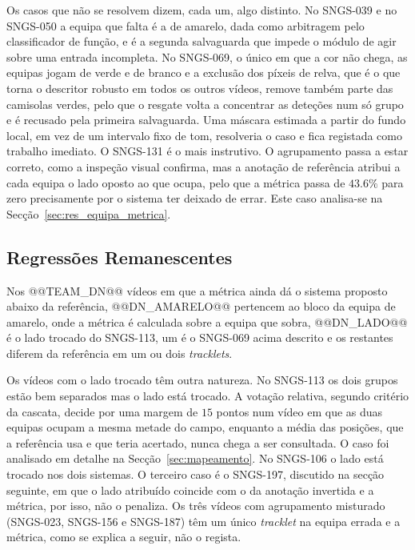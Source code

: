 Os casos que não se resolvem dizem, cada um, algo distinto. No SNGS-039 e no SNGS-050 a equipa que
falta é a de amarelo, dada como arbitragem pelo classificador de função, e é a segunda salvaguarda
que impede o módulo de agir sobre uma entrada incompleta. No SNGS-069, o único em que a cor não
chega, as equipas jogam de verde e de branco e a exclusão dos píxeis de relva, que é o que torna o
descritor robusto em todos os outros vídeos, remove também parte das camisolas verdes, pelo que o
resgate volta a concentrar as deteções num só grupo e é recusado pela primeira salvaguarda. Uma
máscara estimada a partir do fundo local, em vez de um intervalo fixo de tom, resolveria o caso e
fica registada como trabalho imediato. O SNGS-131 é o mais instrutivo. O agrupamento passa a estar
correto, como a inspeção visual confirma, mas a anotação de referência atribui a cada equipa o lado
oposto ao que ocupa, pelo que a métrica passa de $43.6\%$ para zero precisamente por o sistema ter
deixado de errar. Este caso analisa-se na Secção~\ref{sec:res_equipa_metrica}.

\subsection{Regressões Remanescentes}\label{sec:res_equipa_regressoes}

Nos @@TEAM_DN@@ vídeos em que a métrica ainda dá o sistema proposto abaixo da referência,
@@DN_AMARELO@@ pertencem ao bloco da equipa de amarelo, onde a métrica é calculada sobre a equipa
que sobra, @@DN_LADO@@ é o lado trocado do SNGS-113, um é o SNGS-069 acima descrito e os restantes
diferem da referência em um ou dois \emph{tracklets}.

Os vídeos com o lado trocado têm outra natureza. No SNGS-113 os dois grupos estão bem
separados mas o lado está trocado. A votação relativa, segundo critério da cascata, decide por uma margem de
$15$ pontos num vídeo em que as duas equipas ocupam a mesma metade do campo, enquanto a média das
posições, que a referência usa e que teria acertado, nunca chega a ser consultada. O caso foi
analisado em detalhe na Secção~\ref{sec:mapeamento}. No SNGS-106 o lado está trocado nos dois
sistemas. O terceiro caso é o SNGS-197, discutido na secção seguinte, em que o lado atribuído
coincide com o da anotação invertida e a métrica, por isso, não o penaliza. Os três vídeos com agrupamento misturado (SNGS-023, SNGS-156 e SNGS-187) têm um único
\emph{tracklet} na equipa errada e a métrica, como se explica a seguir, não o regista.

